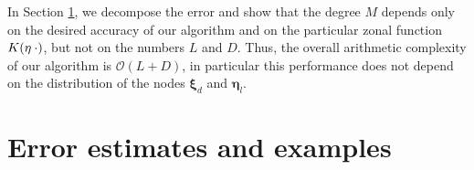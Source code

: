 \documentclass[11pt,a4paper,twoside,bibtotoc]{scrartcl}
\theoremstyle{plain}
\theoremstyle{definition}
\theoremstyle{remark}
\newcommand{\fun}[2]{\ensuremath{#1{\hspace{-0.4ex}}\left(#2\right)}}
\newcommand{\mb}[1]{\mathbf{#1}}
\newcommand{\V}[1]{\mb{#1}}
\numberwithin{equation}{section}
\numberwithin{table}{section}
\numberwithin{figure}{section}
\begin{document}
In Section \ref{Basics:SphericalKernels}, we decompose the error and show
that the degree $M$ depends only on the desired accuracy of our algorithm and
on the particular zonal function $\fun{K}{\V{\eta} \: \cdot}$, but not on the
numbers $L$ and $D$.
Thus, the overall arithmetic complexity of our algorithm is $\mathcal{O}(L +
D)$, in particular this performance does not depend on the distribution of the
nodes $\V{\xi}_{d}$ and $\V{\eta}_{l}$.

\section{Error estimates and examples}\label{Basics:SphericalKernels}
\end{document}
